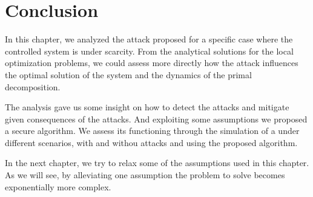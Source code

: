 \documentclass[../main.tex]{subfiles}
\begin{document}
\section{Conclusion}\label{sec:conclusion}
In this chapter, we analyzed the \fdi{} attack proposed for a specific case where the controlled system is under scarcity.
From the analytical solutions for the local optimization problems, we could assess more directly how the attack influences the optimal solution of the system and the dynamics of the primal decomposition.

The analysis gave us some insight on how to detect the attacks and mitigate given consequences of the attacks.
And exploiting some assumptions we proposed a secure \dmpc{} algorithm.
We assess its functioning through the simulation of a \dhn{} under different scenarios, with and withou attacks and using the proposed algorithm.

In the next chapter, we try to relax some of the assumptions used in this chapter.
As we will see, by alleviating one assumption the problem to solve becomes exponentially more complex.
\end{document}
